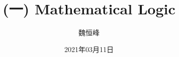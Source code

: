 \documentclass[]{beamer}
\title[(一) Mathematical Logic]{(一) Mathematical Logic}
\author[魏恒峰]{\large 魏恒峰}
\institute{hfwei@nju.edu.cn}
\date{2021年03月11日}
\begin{document}
\maketitle




\thankyou{}

\end{document}
